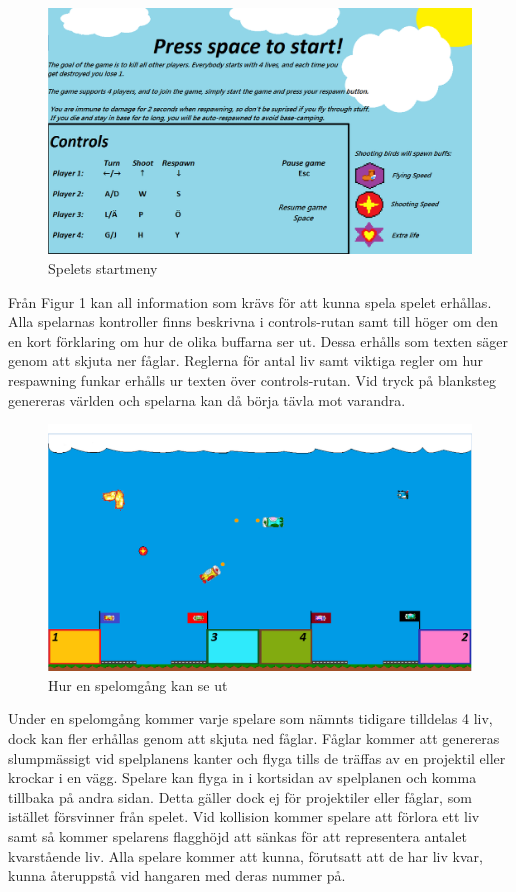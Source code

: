 \documentclass[12pt,a4paper]{article}
\begin{document}
\begin{figure}[H]
	\caption{Spelets startmeny}
	\centering
	\includegraphics[width=\linewidth]{Dogfight_Menu_Example.png}
\end{figure}

Från Figur 1 kan all information som krävs för att kunna spela spelet erhållas. Alla spelarnas kontroller finns beskrivna i controls-rutan samt till höger om den en kort förklaring om hur de olika buffarna ser ut. Dessa erhålls som texten säger genom att skjuta ner fåglar. Reglerna för antal liv samt viktiga regler om hur respawning funkar erhålls ur texten över controls-rutan. Vid tryck på blanksteg genereras världen och spelarna kan då börja tävla mot varandra. \\

\begin{figure}[H]
	\caption{Hur en spelomgång kan se ut}
	\centering
	\includegraphics[width=\linewidth]{Dogfight_Run_Example.png}
\end{figure}

Under en spelomgång kommer varje spelare som nämnts tidigare tilldelas 4 liv, dock kan fler erhållas genom att skjuta ned fåglar. Fåglar kommer att genereras slumpmässigt vid spelplanens kanter och flyga tills de träffas av en projektil eller krockar i en vägg. Spelare kan flyga in i kortsidan av spelplanen och komma tillbaka på andra sidan. Detta gäller dock ej för projektiler eller fåglar, som istället försvinner från spelet. Vid kollision kommer spelare att förlora ett liv samt så kommer spelarens flagghöjd att sänkas för att representera antalet kvarstående liv. Alla spelare kommer att kunna, förutsatt att de har liv kvar, kunna återuppstå vid hangaren med deras nummer på. \\
\end{document}
